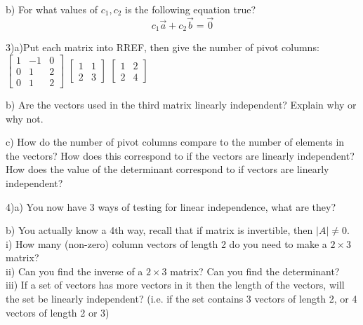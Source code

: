 \documentclass{article}
\begin{document}
\begin{flushleft}
\vspace{1.5in}

b) For what values of $c_1,c_2$ is the following equation true?\\ \begin{equation*} c_1 \vec{a} + c_2 \vec{b} = \vec{0} \end{equation*}

\vspace{1in}

3)a)Put each matrix into RREF, then give the number of pivot columns:\\
$\begin{bmatrix}
1 & -1 & 0\\
0 & 1&2\\
0&1&2
\end{bmatrix}$
\hspace{0.5in}
$\begin{bmatrix}
1 & 1\\
2 & 3
\end{bmatrix}$
\hspace{0.5in}
$\begin{bmatrix}
1 & 2\\
2 & 4
\end{bmatrix}$

\vspace{3in}

b) Are the vectors used in the third matrix linearly independent? Explain why or why not.

\vspace{1in}

c) How do the number of pivot columns compare to the number of elements in the vectors? How does this correspond to if the vectors are linearly independent? How does the value of the determinant correspond to if vectors are linearly independent?

\vspace{1.5in}

4)a) You now have 3 ways of testing for linear independence, what are they?

\vspace{1in}

b) You actually know a 4th way, recall that if matrix is invertible, then $|A|\neq 0$. \\
i) How many (non-zero) column vectors of length 2 do you need to make a $2 \times 3$ matrix?\\
ii) Can you find the inverse of a $2\times 3 $ matrix? Can you find the determinant?\\
iii) If a set of vectors has more vectors in it then the length of the vectors, will the set be linearly independent? (i.e. if the set contains 3 vectors of length 2, or 4 vectors of length 2 or 3)


\end{flushleft}
\end{document}
